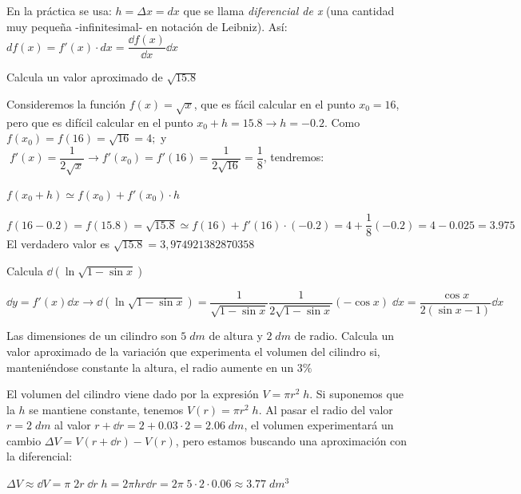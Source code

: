 	
	
		En la práctica se usa:  $h=\Delta x= dx$ que se llama \textit{diferencial de x} (una cantidad muy pequeña -infinitesimal- en notación de Leibniz). Así: $df(x)=f'(x)\cdot dx = \dfrac {\dd f(x)}{\dd x}\dd x$
		
		\begin{ejem} Calcula un valor aproximado de $\sqrt{15.8}$
		
		Consideremos la función $f(x)=\sqrt{x}$, que es fácil calcular en el punto $x_0=16$, pero que es difícil calcular en el punto $x_0+h=15.8\to h=-0.2$. Como $f(x_0)=f(16)=\sqrt{16}=4; $ y $\; f'(x)=\dfrac {1}{2\sqrt{x}}\to f'(x_0)=f'(16)=\dfrac {1}{2\sqrt{16}}=\dfrac 1 8$, tendremos:
		
		$f(x_0+h)\simeq f(x_0)+f'(x_0)\cdot h$ 
		
		$f(16-0.2)=f(15.8)=\sqrt{15.8}\simeq f(16)+f'(16)\cdot (-0.2)=4+\dfrac 1 8 (-0.2)=4-0.025=3.975 \qquad $  \textcolor{gris}{El verdadero valor es $\sqrt{15.8}=3,974921382870358$}
			
		\end{ejem}
		
		\begin{ejem} Calcula $\dd (\ln \sqrt{1-\sin x})$
		
		$\dd y = f'(x) \dd x \to \dd (\ln \sqrt{1-\sin x})= \dfrac {1}{\sqrt{1-\sin x}} \dfrac {1}{2\sqrt{1-\sin x}}(-\cos x)\; \dd x=\dfrac {\cos x}{2(\sin x - 1)} \dd x$	
			
		
					
		\end{ejem}
		
		\begin{ejem} Las dimensiones de un cilindro son $5 \; dm$ de altura y $2 \; dm$ de radio. Calcula un valor aproximado de la variación que experimenta el volumen del cilindro si, manteniéndose constante la altura, el radio aumente en un $3 \%$
		
		El volumen del cilindro viene dado por la expresión $V=\pi r^2 \; h$. Si suponemos que la $h$ se mantiene constante, tenemos $V(r)=\pi r^2 \; h$. Al pasar el radio del valor $r=2\; dm$ al valor $r+\dd r=2+ 0.03\cdot 2=2.06 \; dm$, el volumen experimentará un cambio $\Delta V=V(r+\dd r)-V(r)$, pero estamos buscando una aproximación con la diferencial:
		
		$\Delta V \approx \dd  V =  \pi \; 2 r \; \dd r\; h= 2 \pi h r \dd r = 2 \pi \; 5 \cdot 2 \cdot 0.06 \approx 3.77 \; dm^3$ 
		\end{ejem}
		
